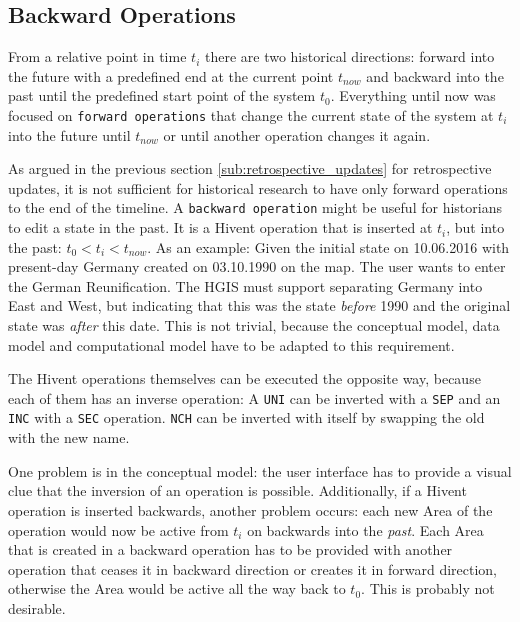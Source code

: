 
\subsection{Backward Operations} %
\label{sub:backward_operations}

From a relative point in time $t_i$ there are two historical directions: forward into the future with a predefined end at the current point $t_{now}$ and backward into the past until the predefined start point of the system $t_0$. Everything until now was focused on \texttt{forward operations} that change the current state of the system at $t_i$ into the future until $t_{now}$ or until another operation changes it again.

As argued in the previous section \ref{sub:retrospective_updates} for retrospective updates, it is not sufficient for historical research to have only forward operations to the end of the timeline.
A \texttt{backward operation} might be useful for historians to edit a state in the past. It is a Hivent operation that is inserted at $t_i$, but into the past: $ t_0 < t_i < t_{now}$. As an example: Given the initial state on 10.06.2016 with present-day Germany created on 03.10.1990 on the map. The user wants to enter the German Reunification. The HGIS must support separating Germany into East and West, but indicating that this was the state \emph{before} 1990 and the original state was \emph{after} this date. This is not trivial, because the conceptual model, data model and computational model have to be adapted to this requirement.

The Hivent operations themselves can be executed the opposite way, because each of them has an inverse operation: A \texttt{UNI} can be inverted with a \texttt{SEP} and an \texttt{INC} with a \texttt{SEC} operation. \texttt{NCH} can be inverted with itself by swapping the old with the new name.

One problem is in the conceptual model: the user interface has to provide a visual clue that the inversion of an operation is possible. Additionally, if a Hivent operation is inserted backwards, another problem occurs: each new Area of the operation would now be active from $t_i$ on backwards into the \emph{past}. Each Area that is created in a backward operation has to be provided with another operation that ceases it in backward direction or creates it in forward direction, otherwise the Area would be active all the way back to $t_0$. This is probably not desirable.


